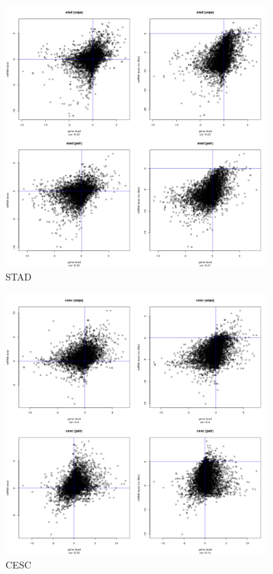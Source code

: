 \documentclass[a4paper,12pt]{article}
\begin{document}
\newpage

\begin{figure}[!h] 
\centering 
\includegraphics[width=0.9\textwidth]{plots/gene_vs_mirna_level_gsa_stad.png} 
\caption{STAD} 
\end{figure} 

\newpage




\begin{figure}[!h] 
\centering 
\includegraphics[width=0.9\textwidth]{plots/gene_vs_mirna_level_gsa_cesc.png} 
\caption{CESC} 
\end{figure} 
\end{document}
